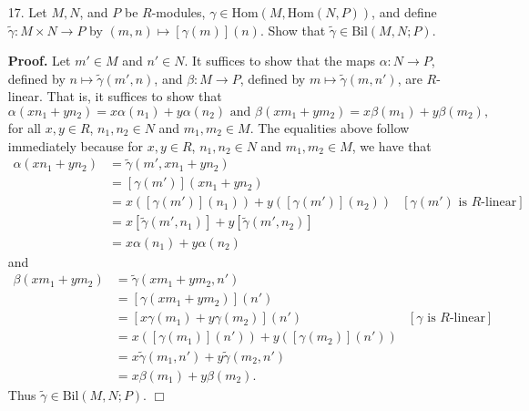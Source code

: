 \documentclass[9pt]{article}
\newcommand{\qed}{\hfill \ensuremath{\Box}}
\begin{document}
\begin{enumerate}
   \item[17.]  Let $M, N$, and $P$ be $R$-modules,
               $\gamma \in \text{Hom}(M, \text{Hom}(N, P))$, and define
               $\tilde{\gamma} : M \times N \rightarrow P$ by
               $(m, n) \mapsto [\gamma(m)](n)$. Show that
               $\tilde{\gamma} \in \text{Bil}(M, N ; P)$.
               
      \textbf{Proof.} Let $m' \in M$ and $n' \in N$. It suffices to show that
      the maps $\alpha : N \rightarrow P$, defined by
      $n \mapsto \tilde{\gamma}(m', n)$, and $\beta : M \rightarrow P$, defined
      by $m \mapsto \tilde{\gamma}(m, n')$, are $R$-linear. That is, it suffices
      to show that
      $$\alpha(xn_1+yn_2)=x\alpha(n_1) + y\alpha(n_2) \text{ and }
        \beta(xm_1+ym_2)=x\beta(m_1) + y\beta(m_2),$$
      for all  $x, y \in R$, $n_1, n_2 \in N$ and $m_1, m_2 \in M$. The
      equalities above follow immediately because for $x, y \in R$,
      $n_1, n_2 \in N$ and $m_1, m_2 \in M$, we have that
      \begin{align*}
         \alpha(xn_1 + yn_2) &= \tilde{\gamma}(m', xn_1+yn_2) \\
            &= [\gamma(m')](xn_1+yn_2) \\
            &= x([\gamma(m')](n_1)) + y([\gamma(m')](n_2))
               &[\gamma(m') \text{ is $R$-linear}] \\
            &= x[\tilde{\gamma}(m', n_1)]+ y[\tilde{\gamma}(m', n_2)]\\
                     &= x\alpha(n_1) + y\alpha(n_2)
      \end{align*}
      and
      \begin{align*}
         \beta(xm_1 + ym_2) &= \tilde{\gamma}(xm_1+ym_2, n') \\
            &= [\gamma(xm_1+ym_2)](n') \\
            &= [x\gamma(m_1)+y\gamma(m_2)](n')
               &[\gamma \text{ is $R$-linear}] \\
            &= x([\gamma(m_1)](n'))+y([\gamma(m_2)](n')) \\
            &= x\tilde{\gamma}(m_1, n')+y\tilde{\gamma}(m_2, n') \\
            &= x\beta(m_1) + y\beta(m_2).
      \end{align*}
      Thus $\tilde{\gamma} \in \text{Bil}(M, N ; P)$. \qed
\end{enumerate}
\end{document}
